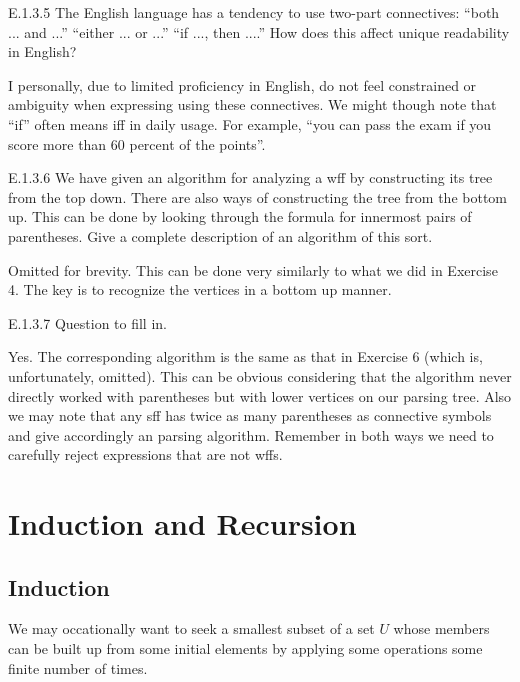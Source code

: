 \begin{exercise}{E.1.3.5}
  The English language has a tendency to use two-part connectives:
  “both ... and ...” “either ... or ...” “if ..., then ....” How does
  this affect unique readability in English?
\end{exercise}

I personally, due to limited proficiency in English, do not feel constrained or ambiguity when expressing using these connectives. We might though note that ``if'' often means iff in daily usage. For example, ``you can pass the exam if you score more than 60 percent of the points''.

\begin{exercise}{E.1.3.6}
  We have given an algorithm for analyzing a wff by constructing its tree from the top down. There are also ways of constructing the tree from the bottom up. This can be done by looking through the formula for innermost pairs of parentheses. Give a complete description of an algorithm of this sort.
\end{exercise}

Omitted for brevity. This can be done very similarly to what we did in Exercise 4. The key is to recognize the vertices in a bottom up manner.

\begin{exercise}{E.1.3.7}
  Question to fill in.
\end{exercise}

Yes. The corresponding algorithm is the same as that in Exercise 6 (which is, unfortunately, omitted). This can be obvious considering that the algorithm never directly worked with parentheses but with lower vertices on our parsing tree. Also we may note that any sff has twice as many parentheses as connective symbols and give accordingly an parsing algorithm. Remember in both ways we need to carefully reject expressions that are not wffs.

\section{Induction and Recursion}

\subsection*{Induction}

We may occationally want to seek a smallest subset of a set $U$ whose members can be built up from some initial elements by applying some operations some finite number of times.

